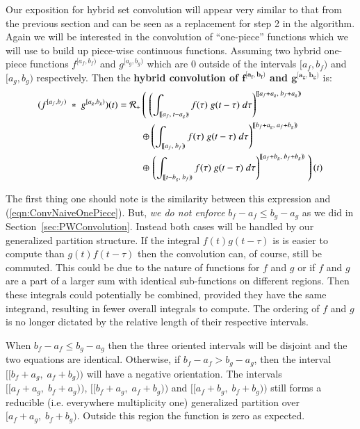 Our exposition for hybrid set convolution will appear very similar to that from the previous section and can be seen as a
 replacement for step 2 in the algorithm.
Again we will be interested in the convolution of ``one-piece'' functions which we will use to build up piece-wise
continuous functions.
Assuming two hybrid one-piece functions $f^{[a_f, b_f)}$ and $g^{[a_g,b_g)}$ which are 0 outside of the intervals
 $[a_f,b_f)$ and $[a_g, b_g)$ respectively.
Then the \textbf{hybrid convolution of $\boldsymbol{f^{[a_f,b_f)}}$ and $\boldsymbol{g^{[a_g,b_g)}}$} is:
	\begin{align}
		\label{eqn:defHConvolution}
		(f^{[a_f,b_f)} \;*\; g^{[a_g,b_g)}) (t) = 
			\R[+] &\left( \; \left( 
				\int_{[\![a_f,\;t-a_g)\!)} f(\tau) \; g(t-\tau) \; d\tau \right)^{[\![a_f+a_g,\; b_f+a_g)\!)} 
					\right. \notag \\ &\oplus \left( 
				\int_{[\![a_f,\;b_f)\!)} f(\tau) \; g(t-\tau) \; d\tau \right)^{[\![b_f+a_g,\; a_f+b_g)\!)} 
					\notag \\ &\oplus \left. \left( 
				\int_{[\![t-b_g,\;b_f)\!)} f(\tau) \; g(t-\tau) \; d\tau \right)^{[\![a_f+b_g,\; b_f+b_g)\!)} 
					\; \right)(t)
	\end{align}

The first thing one should note is the similarity between this expression and (\ref{eqn:ConvNaiveOnePiece}).
But, \emph{we do not enforce} $b_f - a_f \leq b_g - a_g$ as we did in Section~\ref{sec:PWConvolution}.
Instead both cases will be handled by our generalized partition structure.
If the integral $f(t)g(t-\tau)$ is is easier to compute than $g(t)f(t-\tau)$ then the convolution can, of course, 
still be commuted.
This could be due to the nature of functions for $f$ and $g$ or if $f$ and $g$ are a part of a larger sum with identical 
sub-functions on different regions.
Then these integrals could potentially be combined, provided they have the same integrand, resulting in fewer overall 
integrals to compute.
The ordering of $f$ and $g$ is no longer dictated by the relative length of their respective intervals.


When $b_f - a_f \leq b_g - a_g$ then the three oriented intervals will be disjoint and the two equations are identical.
Otherwise, if $b_f - a_f > b_g - a_g$, then the interval $[\![b_f +a_g, \; a_f + b_g)\!)$ will have a negative orientation.
The intervals $[\![a_f+a_g, \; b_f+a_g)\!)$, $[\![b_f+a_g, \; a_f+b_g)\!)$ and $[\![a_f+b_g, \; b_f+b_g)\!)$ still forms
a reducible (i.e. everywhere multiplicity one) generalized partition over $[a_f+a_g, \; b_f+b_g)$.
Outside this region the function is zero as expected. 



